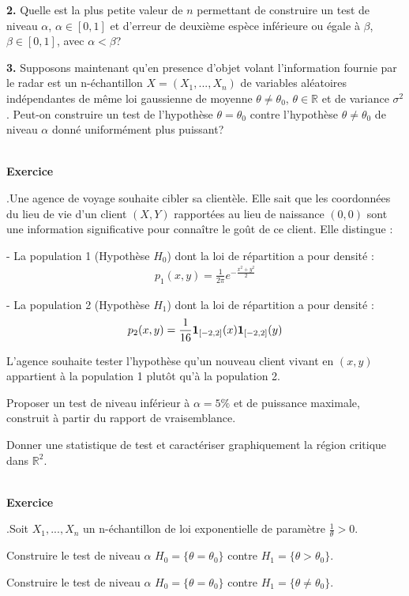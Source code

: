\documentclass[11pt,a4paper]{article}
\newcommand{\R}{\mathbb{R}}\newcommand{\C}{\mathbb{C}}
\def \R{\mathbb{R}}
\def \ni{\noindent}
\def\beqs{\begin{eqnarray*}}
\def\enqs{\end{eqnarray*}}
\newcounter{exo}
\def\exo{\mbox{}\\[0em]\hspace*{0em}\bf Exercice
\addtocounter{exo}{1}\arabic{exo}.\rm\hspace{1ex}}
\begin{document}
\vspace{1mm}

{\bf 2.} Quelle est la plus petite valeur de $n$ permettant de
construire un test de niveau $\alpha$, $\alpha \in  [0, 1]$ et
d'erreur de deuxième espèce inférieure ou égale à $\beta$, $\beta
\in [0, 1]$, avec $\alpha < \beta$?

\vspace{1mm}

{\bf 3.} Supposons maintenant qu'en presence d'objet volant
l'information fournie par le radar est un n-échantillon $X =
(X_1,...,X_n)$ de variables aléatoires indépendantes de même loi
gaussienne de moyenne $\theta \neq \theta_0$, $\theta \in \R$ et
de variance $\sigma^2$. Peut-on construire un test de l'hypothèse
$\theta = \theta_0$ contre l'hypothèse $\theta \neq \theta_0$ de
niveau $\alpha$ donné uniformément plus puissant?

\vspace{1mm}

\exo Une agence de voyage souhaite cibler sa clientèle. Elle sait
que les coordonnées du lieu de vie d'un client $(X,Y)$ rapportées
au lieu de naissance $(0,0)$ sont une information significative
pour connaître le goût de ce client. Elle distingue :


\vspace{1mm}

\ni - La population 1 (Hypothèse $H_0$) dont la loi de répartition
a pour densité : \beqs p_1(x,y) = \frac{1}{2 \pi}
e^{-\frac{x^2+y^2}{2}} \enqs

\vspace{1mm}

\ni - La population 2 (Hypothèse $H_1$) dont la loi de répartition
a pour densité : \beqs p_2(x,y) = \frac{1}{16} {\bf 1}_{[-2,2]}(x)
{\bf 1}_{[-2,2]}(y) \enqs

\vspace{1mm}

\ni L'agence souhaite tester l'hypothèse qu'un nouveau client
vivant en $(x, y)$ appartient à la population 1 plutôt qu'à la
population 2.

\vspace{1mm}

\ni {\bf 1.} Proposer un test de niveau inférieur à $\alpha = 5\%$
et de puissance maximale, construit à partir du rapport de
vraisemblance.

\vspace{1mm}


\ni {\bf 2.} Donner une statistique de test et caractériser
graphiquement la région critique dans $\R^2$.


\exo Soit $X_1,...,X_n$ un n-échantillon de loi exponentielle de
paramètre $\frac{1}{\theta} > 0$.

\vspace{1mm}

\ni {\bf  1.} Construire le test de niveau $\alpha$ $H_0 =
\{\theta = \theta_0\}$ contre $H_1 = \{\theta > \theta_0\}$.

\vspace{1mm}

\ni {\bf 2.} Construire le test de niveau $\alpha$ $H_0 = \{\theta
= \theta_0\}$ contre $H_1 = \{\theta \neq \theta_0\}$.
\end{document}
